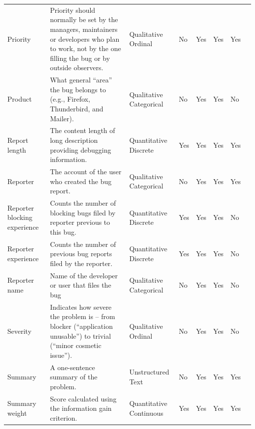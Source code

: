 \begin{table}[h!]
\begin{tabular}{@{}lp{6cm}llllll@{}}
    Priority                     & Priority should normally be set by the managers, maintainers or developers who plan to work, not by the one filling the bug or by outside observers. & Qualitative Ordinal            & No          &    Yes      &   Yes   & Yes\\
    Product                      & What general ``area” the bug belongs to (e.g., Firefox, Thunderbird, and Mailer).                                                                     & Qualitative Categorical           & No          &       Yes   &    Yes\footnotemark  & No\\
    Report length                & The content length of long description providing debugging information.                                                                              & Quantitative Discrete  & Yes         &     Yes     &    Yes  & Yes\\
    Reporter                     & The account of the user who created the bug report.                                                                                                  & Qualitative Categorical            & No          &       Yes   &   Yes   & Yes\\
    Reporter blocking experience & Counts the number of blocking bugs filed by reporter previous to this bug.                                                                           & Quantitative Discrete  & Yes         &   Yes       &   Yes   & No\\
    Reporter experience          & Counts the number of previous bug reports filed by the reporter.                                                                                     & Quantitative Discrete  & Yes         &  Yes        &  Yes    & No\\
    Reporter name                & Name of the developer or user that files the bug                                                                                                     & Qualitative Categorical           & No          &    Yes      &    Yes  & No\\
    Severity                     & Indicates how severe the problem is – from blocker (``application unusable”) to trivial (``minor cosmetic issue”).                                & Qualitative Ordinal            & No          &     Yes     &    Yes  & No\\
    Summary                      & A one-sentence summary of the problem.                                                                                                               & Unstructured Text            & No          &   Yes       &   Yes   & Yes\\
    Summary weight               & Score calculated using the information gain criterion.                                                                                                           & Quantitative Continuous  & Yes         &   Yes       &  Yes    & Yes\\
    \bottomrule
  \end{tabular}
  \label{tab:features_descriptions}
  
\end{table}
